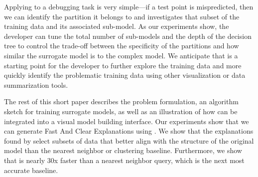 Applying \sys to a debugging task is very simple---if a test point is mispredicted, then we can identify the partition it belongs to and investigates that subset of the training data and its associated sub-model.
As our experiments show, the developer can tune the total number of sub-models and the depth of the decision tree to control the trade-off between the specificity of the partitions and how similar the surrogate model is to the complex model.
We anticipate that \sys is a starting point for the developer to further explore the training data and more quickly identify the problematic training data using other visualization or data summarization tools.

The rest of this short paper describes the \sys problem formulation, an algorithm sketch for training surrogate models, as well as an illustration of how \sys can be integrated into a visual model building interface.
Our experiments show that we can generate Fast And Clear Explanations using \sys.
We show that the explanations found by \sys select subsets of data that better align with the structure of the original model than the nearest neighbor or clustering baseline.
Furthermore, we show that \sys is nearly 30x faster than a nearest neighbor query, which is the next most accurate baseline.






